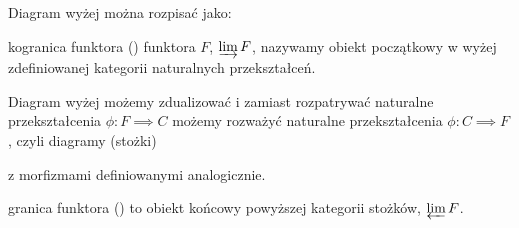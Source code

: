 Diagram wyżej można rozpisać jako:
\begin{center}
\end{center}

\begin{definition}{kogranica funktora}{}
   () funktora $F$, $\varinjlim F$, nazywamy obiekt początkowy w wyżej zdefiniowanej kategorii naturalnych przekształceń. 
\end{definition}

Diagram wyżej możemy zdualizować i zamiast rozpatrywać naturalne przekształcenia $\phi:F\implies C$ możemy rozważyć naturalne przekształcenia $\phi:C\implies F$, czyli diagramy (stożki)
\begin{center}
\end{center}
z morfizmami definiowanymi analogicznie. 

\begin{definition}{granica funktora}{}
   () to obiekt końcowy powyższej kategorii stożków, $\varprojlim F$.
\end{definition}

